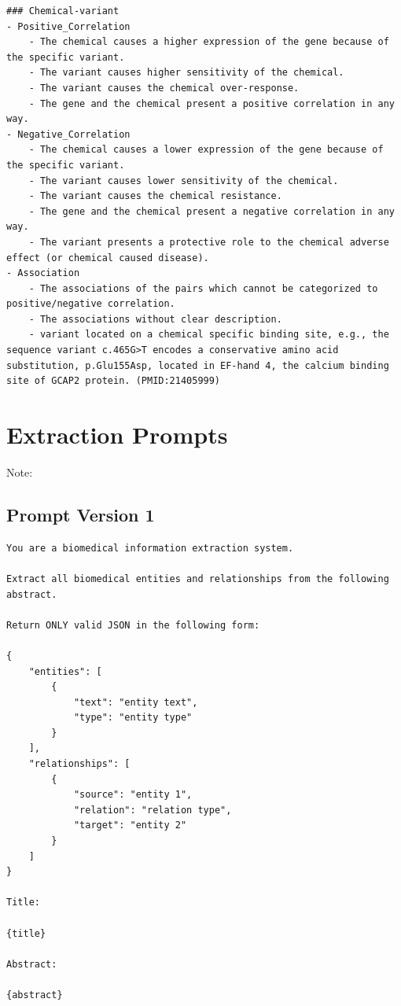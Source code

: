 \begin{lstlisting}
### Chemical-variant
- Positive_Correlation
    - The chemical causes a higher expression of the gene because of the specific variant.
    - The variant causes higher sensitivity of the chemical.
    - The variant causes the chemical over-response.
    - The gene and the chemical present a positive correlation in any way.
- Negative_Correlation
    - The chemical causes a lower expression of the gene because of the specific variant.
    - The variant causes lower sensitivity of the chemical.
    - The variant causes the chemical resistance.
    - The gene and the chemical present a negative correlation in any way.
    - The variant presents a protective role to the chemical adverse effect (or chemical caused disease).
- Association
    - The associations of the pairs which cannot be categorized to positive/negative correlation.
    - The associations without clear description.
    - variant located on a chemical specific binding site, e.g., the sequence variant c.465G>T encodes a conservative amino acid substitution, p.Glu155Asp, located in EF-hand 4, the calcium binding site of GCAP2 protein. (PMID:21405999)
\end{lstlisting}

\chapter{Extraction Prompts}
\label{app:extraction_prompts}
Note: \dep

\section{Prompt Version 1}
\begin{lstlisting}
You are a biomedical information extraction system.

Extract all biomedical entities and relationships from the following abstract.

Return ONLY valid JSON in the following form:

{
	"entities": [
		{
			"text": "entity text",
			"type": "entity type"
		}
	],
	"relationships": [
		{
			"source": "entity 1",
			"relation": "relation type",
			"target": "entity 2"
		}
	]
}

Title:

{title}

Abstract:

{abstract}
\end{lstlisting}

